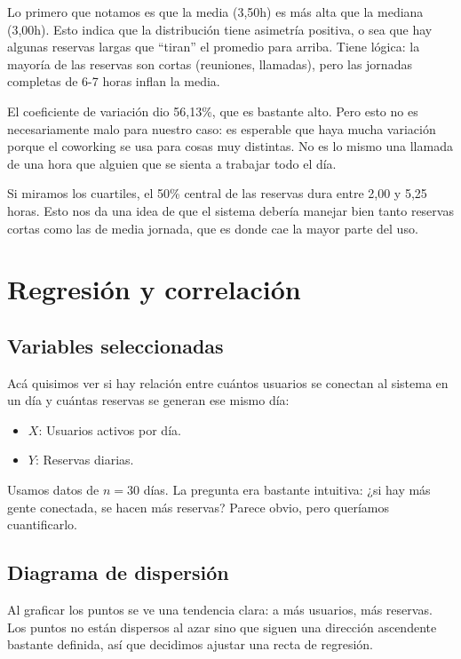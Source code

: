 \documentclass[12pt,a4paper]{article}
\begin{document}
Lo primero que notamos es que la media (3,50h) es más alta que la mediana (3,00h). Esto indica que la distribución tiene asimetría positiva, o sea que hay algunas reservas largas que ``tiran'' el promedio para arriba. Tiene lógica: la mayoría de las reservas son cortas (reuniones, llamadas), pero las jornadas completas de 6-7 horas inflan la media.

El coeficiente de variación dio 56,13\%, que es bastante alto. Pero esto no es necesariamente malo para nuestro caso: es esperable que haya mucha variación porque el coworking se usa para cosas muy distintas. No es lo mismo una llamada de una hora que alguien que se sienta a trabajar todo el día.

Si miramos los cuartiles, el 50\% central de las reservas dura entre 2,00 y 5,25 horas. Esto nos da una idea de que el sistema debería manejar bien tanto reservas cortas como las de media jornada, que es donde cae la mayor parte del uso.

\section{Regresión y correlación}

\subsection{Variables seleccionadas}

Acá quisimos ver si hay relación entre cuántos usuarios se conectan al sistema en un día y cuántas reservas se generan ese mismo día:

\begin{itemize}[itemsep=4pt]
  \item $X$: Usuarios activos por día.
  \item $Y$: Reservas diarias.
\end{itemize}

Usamos datos de $n = 30$ días. La pregunta era bastante intuitiva: ¿si hay más gente conectada, se hacen más reservas? Parece obvio, pero queríamos cuantificarlo.

\subsection{Diagrama de dispersión}

Al graficar los puntos se ve una tendencia clara: a más usuarios, más reservas. Los puntos no están dispersos al azar sino que siguen una dirección ascendente bastante definida, así que decidimos ajustar una recta de regresión.
\end{document}
